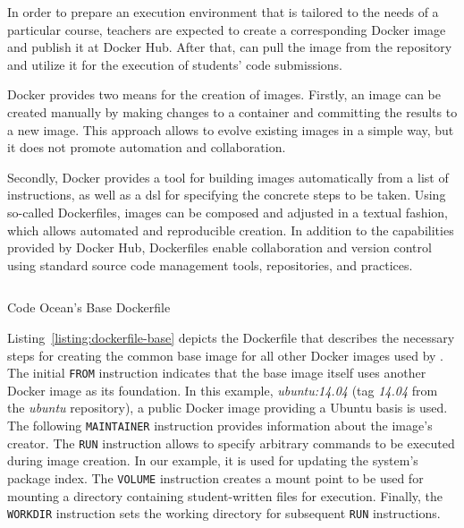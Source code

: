 In order to prepare an execution environment that is tailored to the needs of a particular course, teachers are expected to create a corresponding Docker image and publish it at Docker Hub. After that, \tool can pull the image from the repository and utilize it for the execution of students' code submissions.

Docker provides two means for the creation of images. Firstly, an image can be created manually by making changes to a container and committing the results to a new image. This approach allows to evolve existing images in a simple way, but it does not promote automation and collaboration.

Secondly, Docker provides a tool for building images automatically from a list of instructions, as well as a \gls{dsl} for specifying the concrete steps to be taken. Using so-called Dockerfiles, images can be composed and adjusted in a textual fashion, which allows automated and reproducible creation. In addition to the capabilities provided by Docker Hub, Dockerfiles enable collaboration and version control using standard source code management tools, repositories, and practices.

\begin{listing}
\inputminted[frame=lines]{Dockerfile}{listings/Dockerfile-base}
\vspace{-0.33cm}
\caption{Code Ocean’s Base Dockerfile}
\label{listing:dockerfile-base}
\end{listing}

Listing~\ref{listing:dockerfile-base} depicts the Dockerfile that describes the necessary steps for creating the common base image for all other Docker images used by \tool. The initial \texttt{FROM} instruction indicates that the base image itself uses another Docker image as its foundation. In this example, \emph{ubuntu:14.04} (tag \emph{14.04} from the \emph{ubuntu} repository), a public Docker image providing a Ubuntu basis is used. The following \texttt{MAINTAINER} instruction provides information about the image's creator. The \texttt{RUN} instruction allows to specify arbitrary commands to be executed during image creation. In our example, it is used for updating the system's package index. The \texttt{VOLUME} instruction creates a mount point to be used for mounting a directory containing student-written files for execution. Finally, the \texttt{WORKDIR} instruction sets the working directory for subsequent \texttt{RUN} instructions.

